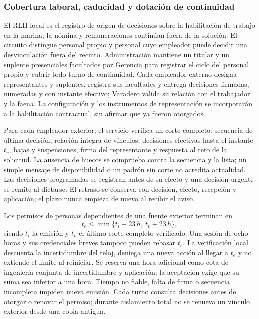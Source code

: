 \subsubsection{Cobertura laboral, caducidad y dotación de continuidad}
\label{subsec:sd5_rlh_cobertura}

El RLH local es el registro de origen de decisiones sobre la habilitación de trabajo en la marina; la nómina y remuneraciones continúan fuera de la solución. El circuito distingue personal propio y personal cuyo empleador puede decidir una desvinculación fuera del recinto. Administración mantiene un titular y un suplente presenciales facultados por Gerencia para registrar el ciclo del personal propio y cubrir todo turno de continuidad. Cada empleador externo designa representantes y suplentes, registra sus facultades y entrega decisiones firmadas, numeradas y con instante efectivo; Varadero valida su relación con el trabajador y la faena. La configuración y los instrumentos de representación se incorporarán a la habilitación contractual, sin afirmar que ya fueron otorgados.

Para cada empleador exterior, el servicio verifica un corte completo: secuencia de última decisión, relación íntegra de vínculos, decisiones efectivas hasta el instante $t_v$, bajas y suspensiones, firma del representante y respuesta al reto de la solicitud. La ausencia de huecos se comprueba contra la secuencia y la lista; un simple mensaje de disponibilidad o un padrón sin corte no acredita actualidad. Las decisiones programadas se registran antes de su efecto y una decisión urgente se remite al dictarse. El retraso se conserva con decisión, efecto, recepción y aplicación; el plazo nunca empieza de nuevo al recibir el aviso.

Los permisos de personas dependientes de una fuente exterior terminan en
\[
t_e\leq\min\{t_i+23\,h,\ t_v+23\,h\},
\]
siendo $t_i$ la emisión y $t_v$ el último corte completo verificado. Una sesión de ocho horas y sus credenciales breves tampoco pueden rebasar $t_e$. La verificación local descuenta la incertidumbre del reloj, deniega una nueva acción al llegar a $t_e$ y no extiende el límite al reiniciar. Se reserva una hora adicional como cota de ingeniería conjunta de incertidumbre y aplicación; la aceptación exige que su suma sea inferior a una hora. Tiempo no fiable, falta de firma o secuencia incompleta impiden nueva emisión. Cada turno consulta decisiones antes de otorgar o renovar el permiso; durante aislamiento total no se renueva un vínculo exterior desde una copia antigua.


